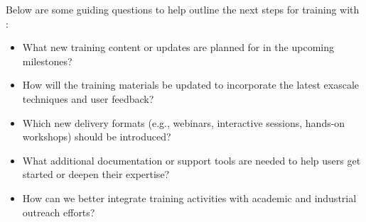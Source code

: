 Below are some guiding questions to help outline the next steps for training with :
\begin{itemize}
    \item What new training content or updates are planned for  in the upcoming milestones?
    \item How will the training materials be updated to incorporate the latest exascale techniques and user feedback?
    \item Which new delivery formats (e.g., webinars, interactive sessions, hands-on workshops) should be introduced?
    \item What additional documentation or support tools are needed to help users get started or deepen their expertise?
    \item How can we better integrate training activities with academic and industrial outreach efforts?
\end{itemize}